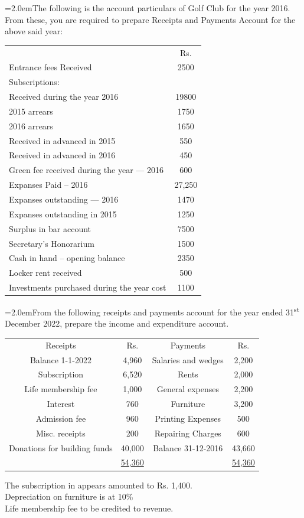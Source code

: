 \documentclass[11pt,a4paper]{article}
\newcommand{\lqn}[2]{\Needspace{6\baselineskip}\par\medskip\noindent\hangindent=2.0em\hangafter=1\makebox[2.0em][l]{\textbf{#1.}}#2\par}
\begin{document}
\lqn{28}{The following is the account particulars of Golf Club for the year 2016. From these, you are required to prepare Receipts and Payments Account for the above said year:\par
\par\smallskip\noindent\hspace*{1.2em}\begin{tabular}{|lc|}
\hline
 & Rs. \\
Entrance fees Received & 2500 \\
Subscriptions: &  \\
Received during the year 2016 & 19800 \\
2015 arrears & 1750 \\
2016 arrears & 1650 \\
Received in advanced in 2015 & 550 \\
Received in advanced in 2016 & 450 \\
Green fee received during the year --- 2016 & 600 \\
Expanses Paid – 2016 & 27,250 \\
Expanses outstanding --- 2016 & 1470 \\
Expanses outstanding in 2015 & 1250 \\
Surplus in bar account & 7500 \\
Secretary’s Honorarium & 1500 \\
Cash in hand -- opening balance & 2350 \\
Locker rent received & 500 \\
Investments purchased during the year cost & 1100 \\
\hline
\end{tabular}\par\smallskip
}
\lqn{29}{From the following receipts and payments account for the year ended 31\textsuperscript{st}  December 2022, prepare the income and expenditure account.\par
\par\smallskip\noindent\hspace*{1.2em}\begin{tabular}{|cccc|}
\hline
Receipts & Rs. & Payments & Rs. \\
Balance 1-1-2022 & 4,960 & Salaries and wedges & 2,200 \\
Subscription & 6,520 & Rents & 2,000 \\
Life membership fee & 1,000 & General expenses & 2,200 \\
Interest & 760 & Furniture & 3,200 \\
Admission fee & 960 & Printing Expenses & 500 \\
Misc. receipts & 200 & Repairing Charges & 600 \\
Donations for building funds & 40,000 & Balance 31-12-2016 & 43,660 \\
 & \underline{54,360} &  & \underline{54,360} \\
\hline
\end{tabular}\par\smallskip
The subscription in appears amounted to Rs. 1,400.\\
Depreciation on furniture is at 10\%\\
Life membership fee to be credited to revenue.\par
}
\end{document}
